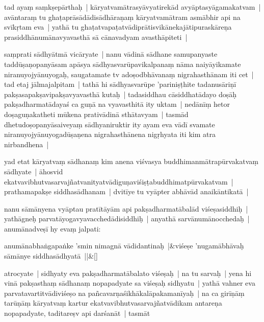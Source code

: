 \documentclass[article,12pt,a4paper]{memoir}
\begin{document}
	  \pstart tad ayaṃ saṃkṣepārthaḥ | kāryatvamātrasyāvyatirekād avyāptasyāgamakatvam | avāntaraṃ tu ghaṭaprāsādādisādhāraṇaṃ kāryatvamātram asmābhir api na svīkṛtam eva | yathā tu ghaṭatvapaṭatvādiprātisvikānekajātipuraskāreṇa prasiddhānumānavyavasthā sā cānavadyam avasthāpiteti |
	\pend
      \label{rnā__īsd__sādhya}
	  
	

	  \pstart saṃprati sādhyātmā vicāryate | nanu vādinā sādhane samupanyaste taddūṣaṇopanyāsam apāsya sādhyasvarūpavikalpanaṃ nāma naiyāyikamate niranuyojyānuyogaḥ, saugatamate tv adoṣodbhāvanaṃ nigrahasthānam iti cet | tad etaj jālmajalpitam | tathā hi sādhyasvarūpe 'pariniṣṭhite tadanusāriṇī pakṣasapakṣavipakṣavyavasthā kutaḥ | tadasiddhau cāsiddhatādayo doṣāḥ pakṣadharmatādayaś ca guṇā na vyavasthitā ity uktam | nedānīṃ hetor doṣaguṇakatheti mūkena prativādinā sthātavyam | tasmād dhetudoṣopanyāsaiveyaṃ sādhyaniruktir ity ayam eva vādī svamate niranuyojyānuyogadūṣaṇena nigrahasthānena nigṛhyata iti kim atra nirbandhena | 
	\pend
      

	  \pstart yad etat kārya\leavevmode{}\label{RNAms_31a}tvaṃ sādhanaṃ kim anena viśvasya buddhimanmātrapūrvakatvaṃ sādhyate | āhosvid ekatvavibhutvasarvajñatvanityatvādiguṇaviśiṣṭabuddhimatpūrvakatvam | prathamapakṣe siddhasādhanam | dvitīye tu vyāpter abhāvād anaikāntikatā |
	\pend
      

	  \pstart nanu sāmānyena vyāptau pratītāyām api pakṣadharmatābalād viśeṣasiddhiḥ | yathāgneḥ parvatāyogavyavacchedādisiddhiḥ | anyathā sarvānumānocchedaḥ | anumānadveṣī hy evaṃ jalpati:
	\pend
      
	    
	    \stanza[\smallbreak]
	anumānabhaṅgapaṅke 'smin nimagnā vādidantinaḥ |&viśeṣe 'nugamābhāvaḥ sāmānye siddhasādhyatā ||\&[\smallbreak]


	

	  \pstart atrocyate | \label{sarit__ratnakīrtinibandhāvali__149196}sidhyaty eva pakṣadharmatābalato viśeṣaḥ | na tu sarvaḥ | yena hi vinā \label{rnā__147220}pakṣasthaṃ sādhanaṃ\label{rnā__147269} nopapadyate sa viśeṣaḥ sidhyatu | yathā vahner eva parvatavartitvādiviśeṣo\label{sarit__ratnakīrtinibandhāvali__149477} na pañcavarṇaśikhākalāpakamanīyaḥ | na ca girīṇāṃ tarūṇāṃ kāryatvaṃ kartur ekatvavibhutvasarvajñatvādikam antareṇa nopapadyate, taditareṣv api darśanāt | tasmāt
	\pend
      
\end{document}
